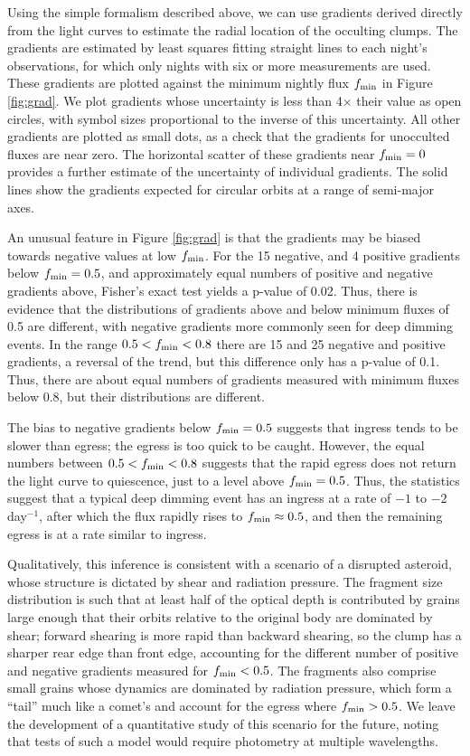 \documentclass[useAMS,usenatbib,usegraphicx]{mn2e}
\begin{document}
Using the simple formalism described above, we can use gradients derived directly from
the light curves to estimate the radial location of the occulting clumps. The gradients
are estimated by least squares fitting straight lines to each night's observations, for
which only nights with six or more measurements are used. These gradients are plotted
against the minimum nightly flux $f_{\rm min}$ in Figure \ref{fig:grad}. We plot
gradients whose uncertainty is less than 4$\times$ their value as open circles, with
symbol sizes proportional to the inverse of this uncertainty. All other gradients are
plotted as small dots, as a check that the gradients for unocculted fluxes are near
zero. The horizontal scatter of these gradients near $f_{\rm min}=0$ provides a further
estimate of the uncertainty of individual gradients. The solid lines show the gradients
expected for circular orbits at a range of semi-major axes.

An unusual feature in Figure \ref{fig:grad} is that the gradients may be biased towards
negative values at low $f_{\rm min}$. For the 15 negative, and 4 positive gradients below
$f_{\rm min}=0.5$, and approximately equal numbers of positive and negative gradients
above, Fisher's exact test yields a p-value of 0.02. Thus, there is evidence that the
distributions of gradients above and below minimum fluxes of 0.5 are different, with
negative gradients more commonly seen for deep dimming events. In the range
$0.5<f_{\rm min}<0.8$ there are 15 and 25 negative and positive gradients, a reversal of
the trend, but this difference only has a p-value of 0.1. Thus, there are about equal
numbers of gradients measured with minimum fluxes below 0.8, but their distributions are
different.

The bias to negative gradients below $f_{\rm min}=0.5$ suggests that ingress tends to be
slower than egress; the egress is too quick to be caught. However, the equal numbers
between $0.5 < f_{\rm min} < 0.8$ suggests that the rapid egress does not return the
light curve to quiescence, just to a level above $f_{\rm min}=0.5$. Thus, the statistics
suggest that a typical deep dimming event has an ingress at a rate of $-1$ to $-2$
day$^{-1}$, after which the flux rapidly rises to $f_{\rm min} \approx 0.5$, and then the
remaining egress is at a rate similar to ingress.

Qualitatively, this inference is consistent with a scenario of a disrupted asteroid,
whose structure is dictated by shear and radiation pressure. The fragment size
distribution is such that at least half of the optical depth is contributed by grains
large enough that their orbits relative to the original body are dominated by shear;
forward shearing is more rapid than backward shearing, so the clump has a sharper rear
edge than front edge, accounting for the different number of positive and negative
gradients measured for $f_{\rm min} < 0.5$. The fragments also comprise small grains
whose dynamics are dominated by radiation pressure, which form a ``tail'' much like a
comet's and account for the egress where $f_{\rm min} > 0.5$. We leave the development of
a quantitative study of this scenario for the future, noting that tests of such a model
would require photometry at multiple wavelengths.
\end{document}
